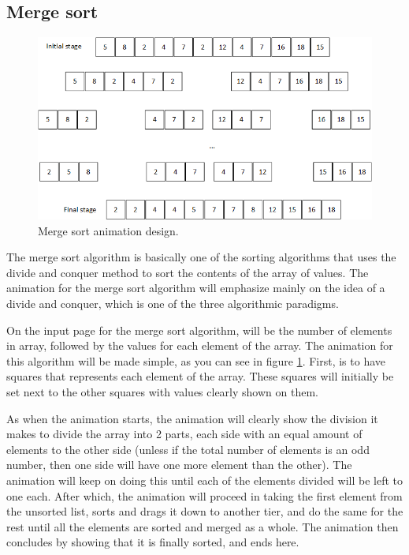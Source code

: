 \newpage

\subsection{Merge sort}

\begin{figure}[H]
\centering
\includegraphics[scale=0.9]{images/report_images/animationDesignMergeSort.png}
\caption{Merge sort animation design.}
\label{animationDesignMergeSort}
\end{figure}

The merge sort algorithm is basically one of the sorting algorithms that uses the divide and conquer method to sort the contents of the array of values. The animation for the merge sort algorithm will emphasize mainly on the idea of a divide and conquer, which is one of the three algorithmic paradigms. 

On the input page for the merge sort algorithm, will be the number of elements in array, followed by the values for each element of the array. The animation for this algorithm will be made simple, as you can see in figure \ref{animationDesignMergeSort}. First, is to have squares that represents each element of the array. These squares will initially be set next to the other squares with values clearly shown on them.

As when the animation starts, the animation will clearly show the division it makes to divide the array into 2 parts, each side with an equal amount of elements to the other side (unless if the total number of elements is an odd number, then one side will have one more element than the other). The animation will keep on doing this until each of the elements divided will be left to one each. After which, the animation will proceed in taking the first element from the unsorted list, sorts and drags it down to another tier, and do the same for the rest until all the elements are sorted and merged as a whole. The animation then concludes by showing that it is finally sorted, and ends here.

